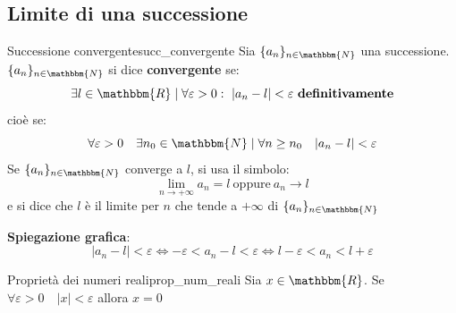 \documentclass[12pt]{report}
\newcounter{definition}
\newcommand{\nmu}{}
\begin{document}
	\subsection{Limite di una successione}
	\begin{definition}{\nmu Successione convergente}{succ_convergente}
		Sia $\{a_n\}_{n \in \mathbbm{N}}$ una successione. \\
		$\{a_n\}_{n \in \mathbbm{N}}$ si dice \textbf{convergente} se: \[\exists l \in \mathbbm{R} \mid \forall \varepsilon > 0:\ |a_n - l| < \varepsilon\ \textbf{definitivamente}\]
		cioè se:
		\[
		\forall \varepsilon > 0 \quad \exists n_0 \in \mathbbm{N} \mid \forall n \geq n_0 \quad |a_n - l| < \varepsilon
		\]
		Se $\{a_n\}_{n \in \mathbbm{N}}$ converge a $l$, si usa il simbolo:
		\[
		\lim_{n \to +\infty}a_n = l\ \text{oppure}\ a_n \to l
		\]
		e si dice che $l$ è il limite per $n$ che tende a $+\infty$ di $\{a_n\}_{n \in \mathbbm{N}}$
	\end{definition}
	\textbf{Spiegazione grafica}:
	\[
	|a_n - l| < \varepsilon \iff -\varepsilon < a_n - l < \varepsilon \iff l - \varepsilon < a_n < l + \varepsilon
	\]
	\begin{note}{\nmu Proprietà dei numeri reali}{prop_num_reali}
		Sia $x \in \mathbbm{R}$. Se $\forall \varepsilon > 0 \quad |x| < \varepsilon$ allora $x = 0$
	\end{note}
\end{document}
